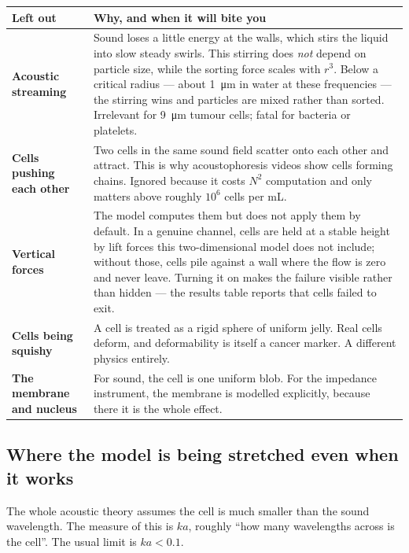 \documentclass[11pt,a4paper]{article}
\begin{document}
\begin{center}\small
\begin{tabular}{p{4.3cm}p{10.3cm}}
\toprule
\textbf{Left out} & \textbf{Why, and when it will bite you} \\
\midrule
\textbf{Acoustic streaming} &
Sound loses a little energy at the walls, which stirs the liquid into slow
steady swirls. This stirring does \emph{not} depend on particle size, while the
sorting force scales with $r^3$. Below a critical radius --- about
\SI{1}{\micro\meter} in water at these frequencies --- the stirring wins and
particles are mixed rather than sorted. Irrelevant for \SI{9}{\micro\meter}
tumour cells; fatal for bacteria or platelets. \\[4pt]
\textbf{Cells pushing each other} &
Two cells in the same sound field scatter onto each other and attract. This is
why acoustophoresis videos show cells forming chains. Ignored because it costs
$N^2$ computation and only matters above roughly $10^6$ cells per mL. \\[4pt]
\textbf{Vertical forces} &
The model computes them but does not apply them by default. In a genuine
channel, cells are held at a stable height by lift forces this two-dimensional
model does not include; without those, cells pile against a wall where the flow
is zero and never leave. Turning it on makes the failure visible rather than
hidden --- the results table reports that cells failed to exit. \\[4pt]
\textbf{Cells being squishy} &
A cell is treated as a rigid sphere of uniform jelly. Real cells deform, and
deformability is itself a cancer marker. A different physics entirely. \\[4pt]
\textbf{The membrane and nucleus} &
For sound, the cell is one uniform blob. For the impedance instrument, the
membrane is modelled explicitly, because there it is the whole effect. \\
\bottomrule
\end{tabular}
\end{center}

\subsection*{Where the model is being stretched even when it works}

The whole acoustic theory assumes the cell is much smaller than the sound
wavelength. The measure of this is $k a$, roughly ``how many wavelengths across
is the cell''. The usual limit is $ka < 0.1$.
\end{document}
